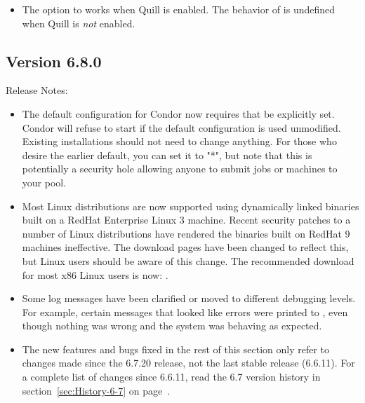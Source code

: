 \begin{itemize}

\item The  option to  works
when Quill is enabled.  The behavior of 
 is undefined when Quill is \emph{not}
enabled.

\end{itemize}




\subsection*{\label{sec:New-6-8-0}Version 6.8.0}

\noindent Release Notes:

\begin{itemize}

\item The default configuration for Condor now requires that
 be explicitly set.  Condor will refuse
to start if the default configuration is used unmodified.
Existing installations should not need to change anything.  For
those who desire the earlier default, you can set it to "*", but
note that this is potentially a security hole allowing anyone to
submit jobs or machines to your pool.

\item Most Linux distributions are now supported using dynamically
  linked binaries built on a RedHat Enterprise Linux 3 machine.
  Recent security patches to a number of Linux distributions have
  rendered the binaries built on RedHat 9 machines ineffective.
  The download pages have been changed to reflect this, but Linux users
  should be aware of this change.
  The recommended download for most x86 Linux users is now:
  .

\item Some log messages have been clarified or moved to different
  debugging levels.
  For example, certain messages that looked like errors were printed
  to , even though nothing was wrong and the system was
  behaving as expected.

\item The new features and bugs fixed in the rest of this section only
  refer to changes made since the 6.7.20 release, not the last stable
  release (6.6.11).
  For a complete list of changes since 6.6.11, read the 6.7 version
  history in section~\ref{sec:History-6-7} on
  page~\pageref{sec:History-6-7}. 

\end{itemize}


